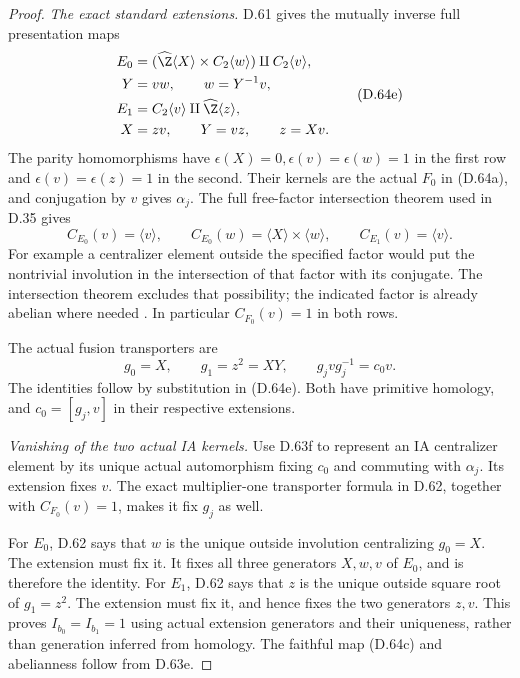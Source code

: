 \begin{proof}
\emph{The exact standard extensions.}
D.61 gives the mutually inverse full presentation maps
\[
 \begin{aligned}
 E_0&=(\widehat\Z\langle X\rangle\times C_2\langle w\rangle)
                                      \amalg C_2\langle v\rangle,\\
 Y&=vw,\qquad w=Y^{-1}v,\\
 E_1&=C_2\langle v\rangle\amalg\widehat\Z\langle z\rangle,\\
 X&=zv,\qquad Y=vz,\qquad z=Xv .
 \end{aligned}                                                \tag{D.64e}
\]
The parity homomorphisms have
$\epsilon(X)=0,\epsilon(v)=\epsilon(w)=1$ in the
first row and $\epsilon(v)=\epsilon(z)=1$ in the
second. Their kernels are the actual $F_0$ in
(D.64a), and conjugation by $v$ gives $\alpha_j$.
The full free-factor intersection theorem used
in D.35 gives
\[
 C_{E_0}(v)=\langle v\rangle,\qquad
 C_{E_0}(w)=\langle X\rangle\times\langle w\rangle,\qquad
 C_{E_1}(v)=\langle v\rangle.
                                                               \tag{D.64f}
\]
For example a centralizer element outside the
specified factor would put the nontrivial involution
in the intersection of that factor with its conjugate.
The intersection theorem excludes that possibility;
the indicated factor is already abelian where needed
\cite[Theorem 5 of the inspected author version]{A-HerfortZalesskii2008}.
In particular $C_{F_0}(v)=1$ in both rows.

The actual fusion transporters are
\[
          g_0=X,\qquad g_1=z^2=XY,\qquad
          g_jvg_j^{-1}=c_0v.
                                                               \tag{D.64g}
\]
The identities follow by substitution in (D.64e).
Both have primitive homology, and
$c_0=[g_j,v]$ in their respective extensions.

\emph{Vanishing of the two actual IA kernels.}
Use D.63f to represent an IA centralizer element
by its unique actual automorphism fixing $c_0$
and commuting with $\alpha_j$.
Its extension fixes $v$.
The exact multiplier-one transporter formula in
D.62, together with $C_{F_0}(v)=1$, makes it fix
$g_j$ as well.

For $E_0$, D.62 says that $w$ is the unique
outside involution centralizing $g_0=X$.
The extension must fix it.
It fixes all three generators $X,w,v$ of $E_0$,
and is therefore the identity.
For $E_1$, D.62 says that $z$ is the unique
outside square root of $g_1=z^2$.
The extension must fix it, and hence fixes the
two generators $z,v$.
This proves $I_{b_0}=I_{b_1}=1$ using actual
extension generators and their uniqueness, rather
than generation inferred from homology.
The faithful map (D.64c) and abelianness follow
from D.63e.


\end{proof}
